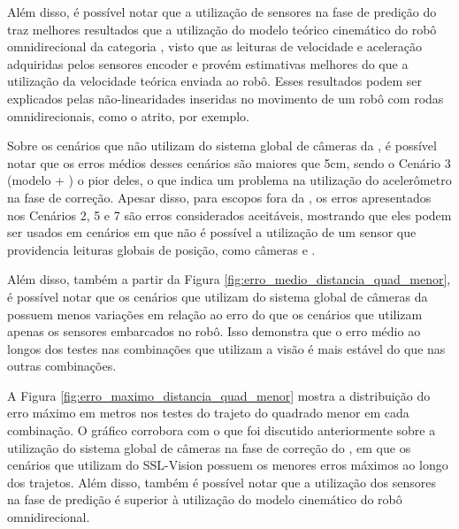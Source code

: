 \documentclass[acronym, symbols, table, deposito]{fei}
\begin{document}
	Além disso, é possível notar que a utilização de sensores na fase de predição do  traz melhores resultados que a utilização do modelo teórico cinemático do robô omnidirecional da categoria , visto que as leituras de velocidade e aceleração adquiridas pelos sensores encoder e  provém estimativas melhores do que a utilização da velocidade teórica enviada ao robô. Esses resultados podem ser explicados pelas não-linearidades inseridas no movimento de um robô com rodas omnidirecionais, como o atrito, por exemplo.
	
	Sobre os cenários que não utilizam do sistema global de câmeras da , é possível notar que os erros médios desses cenários são maiores que 5cm, sendo o Cenário 3 (modelo + ) o pior deles, o que indica um problema na utilização do acelerômetro na fase de correção. Apesar disso, para escopos fora da , os erros apresentados nos Cenários 2, 5 e 7 são erros considerados aceitáveis, mostrando que eles podem ser usados em cenários em que não é possível a utilização de um sensor que providencia leituras globais de posição, como câmeras e .

	Além disso, também a partir da Figura \ref{fig:erro_medio_distancia_quad_menor}, é possível notar que os cenários que utilizam do sistema global de câmeras da  possuem menos variações em relação ao erro do que os cenários que utilizam apenas os sensores embarcados no robô. Isso demonstra que o erro médio ao longos dos testes nas combinações que utilizam a visão é mais estável do que nas outras combinações.
	
	A Figura \ref{fig:erro_maximo_distancia_quad_menor} mostra a distribuição do erro máximo em metros nos testes do trajeto do quadrado menor em cada combinação. O gráfico corrobora com o que foi discutido anteriormente sobre a utilização do sistema global de câmeras na fase de correção do , em que os cenários que utilizam do SSL-Vision possuem os menores erros máximos ao longo dos trajetos. Além disso, também é possível notar que a utilização dos sensores na fase de predição é superior à utilização do modelo cinemático do robô omnidirecional.
	
\end{document}
